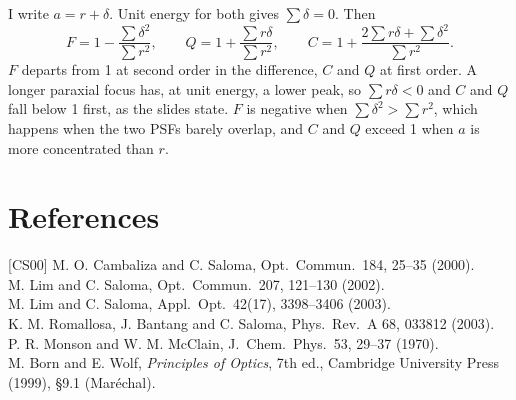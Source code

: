 \documentclass[11pt]{article}
\begin{document}
 I write $a = r + \delta$. Unit energy for both gives $\sum\delta = 0$. Then
\begin{equation}F = 1 - \frac{\sum\delta^2}{\sum r^2},\qquad Q = 1 + \frac{\sum r\delta}{\sum r^2},\qquad
C = 1 + \frac{2\sum r\delta + \sum\delta^2}{\sum r^2} .\end{equation}
$F$ departs from 1 at second order in the difference, $C$ and $Q$ at first order. A longer paraxial focus has, at
unit energy, a lower peak, so $\sum r\delta < 0$ and $C$ and $Q$ fall below 1 first, as the slides state.
$F$ is negative when $\sum\delta^2 > \sum r^2$, which happens when the two PSFs barely overlap, and $C$ and $Q$ exceed 1
when $a$ is more concentrated than $r$.


\section*{References}
\small
[CS00] M. O. Cambaliza and C. Saloma, Opt.\ Commun.\ 184, 25--35 (2000).\\
\relax[LS02] M. Lim and C. Saloma, Opt.\ Commun.\ 207, 121--130 (2002).\\
\relax[LS03] M. Lim and C. Saloma, Appl.\ Opt.\ 42(17), 3398--3406 (2003).\\
\relax[Rom03] K. M. Romallosa, J. Bantang and C. Saloma, Phys.\ Rev.\ A 68, 033812 (2003).\\
P. R. Monson and W. M. McClain, J.\ Chem.\ Phys.\ 53, 29--37 (1970).\\
M. Born and E. Wolf, \emph{Principles of Optics}, 7th ed., Cambridge University Press (1999), §9.1 (Maréchal).
\end{document}
